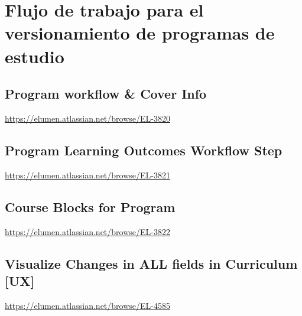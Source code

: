 \section{Flujo de trabajo para el versionamiento de programas de estudio}
\subsection{Program workflow \& Cover Info}
\url{https://elumen.atlassian.net/browse/EL-3820}

\subsection{Program Learning Outcomes Workflow Step}
\url{https://elumen.atlassian.net/browse/EL-3821}

\subsection{Course Blocks for Program}
\url{https://elumen.atlassian.net/browse/EL-3822}

\subsection{Visualize Changes in ALL fields in Curriculum [UX]}
\url{https://elumen.atlassian.net/browse/EL-4585}